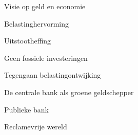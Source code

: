 
\begin{visie-concept}{Visie op geld en economie}\end{visie-concept}

\begin{voorstel-concept}{Belastinghervorming}\end{voorstel-concept}
\begin{voorstel-concept}{Uitstootheffing}\end{voorstel-concept}
\begin{voorstel-concept}{Geen fossiele investeringen}\end{voorstel-concept}
\begin{voorstel-concept}{Tegengaan belastingontwijking}\end{voorstel-concept}
\begin{voorstel-concept}{De centrale bank als groene geldschepper}\end{voorstel-concept}
\begin{voorstel-concept}{Publieke bank}\end{voorstel-concept}
\begin{voorstel-concept}{Reclamevrije wereld}\end{voorstel-concept}
